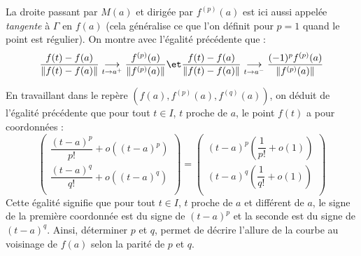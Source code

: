 \documentclass[a4paper,10pt]{report}
\begin{document}
\begin{Remarque}{} La droite passant par $M(a)$ et dirigée par $f^{(p)}(a)$ est ici aussi appelée \emph{tangente} à $\Gamma$ en $f(a)$ (cela généralise ce que l'on définit pour $p=1$ quand le point est régulier). On montre avec l'égalité précédente que :
$$ \dfrac{f(t)-f(a)}{\Vert f(t)-f(a) \Vert} \underset{t \rightarrow a^+}{\longrightarrow} \frac{f^{(p)}(a)}{\Vert f^{(p)}(a) \Vert} \et  \dfrac{f(t)-f(a)}{\Vert f(t)-f(a) \Vert} \underset{t \rightarrow a^-}{\longrightarrow} \frac{(-1)^p f^{(p)}(a)}{\Vert f^{(p)}(a) \Vert}$$
\end{Remarque}
En travaillant dans le repère $(f(a), f^{(p)}(a), f^{(q)}(a))$, on déduit de l'égalité précédente que pour tout $t \in I$, $t$ proche de $a$, le point $f(t)$ a pour coordonnées :
$$ \begin{pmatrix}
\dfrac{(t-a)^p}{p!}+o((t-a)^p) \\
\dfrac{(t-a)^q}{q!}+o((t-a)^q) \\
\end{pmatrix} = \begin{pmatrix}
(t-a)^p \left( \dfrac{1}{p!} + o(1) \right) \\
(t-a)^q \left( \dfrac{1}{q!} + o(1) \right) \\
\end{pmatrix}$$
Cette égalité signifie que pour tout $t \in I$, $t$ proche de $a$ et différent de $a$, le signe de la première coordonnée est du signe de $(t-a)^p$ et la seconde est du signe de $(t-a)^q$. Ainsi, déterminer $p$ et $q$, permet de décrire l'allure de la courbe au voisinage de $f(a)$ selon la parité de $p$ et $q$.

\newpage
\end{document}
